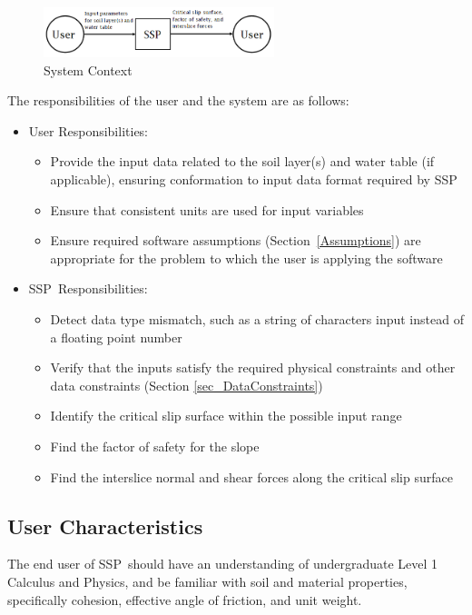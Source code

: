 \documentclass[12pt]{article}
\newcommand{\progname}{SSP}
\begin{document}
\begin{figure}[h!]
	\begin{center}
		\includegraphics[width=0.6\textwidth]{SystemContextFigure.png}
		\caption{System Context}
		\label{Fig_SystemContext}
	\end{center}
\end{figure}

\noindent The responsibilities of the user and the system are as follows:

\begin{itemize}
\item User Responsibilities:
  \begin{itemize}
  \item Provide the input data related to the soil layer(s) and water table (if 
  applicable), ensuring conformation to input data format required by \progname
  \item Ensure that consistent units are used for input variables
  \item Ensure required software assumptions (Section~\ref{Assumptions}) are
    appropriate for the problem to which the user is applying the software
  \end{itemize}
\item \progname\ Responsibilities:
  \begin{itemize}
  \item Detect data type mismatch, such as a string of characters input instead
    of a floating point number
  \item Verify that the inputs satisfy the required physical constraints and 
  other data constraints (Section \ref{sec_DataConstraints})
  \item Identify the critical slip surface within the possible input range
  \item Find the factor of safety for the slope
  \item Find the interslice normal and shear forces along the critical slip 
  surface
  \end{itemize}
\end{itemize}

\subsection{User Characteristics}
\label{Sec:UserChar}
The end user of \progname\ should have an understanding of undergraduate
Level 1 Calculus and Physics, and be familiar with soil and material
properties, specifically cohesion, effective angle of friction, and unit weight.
\end{document}

